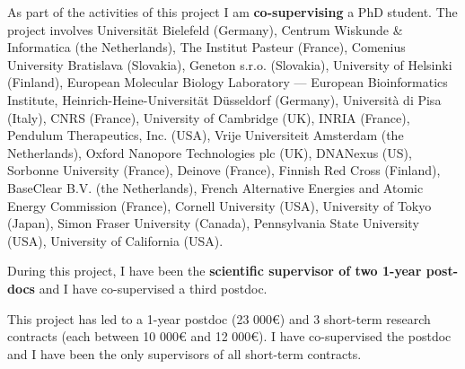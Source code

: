 \documentclass[11pt,a4paper,roman]{moderncv}
\begin{document}
As part of the activities of this project I am \textbf{co-supervising} a PhD student.
The project involves Universität Bielefeld (Germany), Centrum Wiskunde \& Informatica (the Netherlands), The
Institut Pasteur (France), Comenius University Bratislava (Slovakia), Geneton s.r.o.
(Slovakia), University of Helsinki (Finland), European Molecular Biology
Laboratory --- European Bioinformatics Institute,
Heinrich-Heine-Universität Düsseldorf (Germany),
Università di Pisa (Italy),
CNRS (France),
University of Cambridge (UK),
INRIA (France),
Pendulum Therapeutics, Inc. (USA),
Vrije Universiteit Amsterdam (the Netherlands),
Oxford Nanopore Technologies plc (UK),
DNANexus (US),
Sorbonne University (France),
Deinove (France),
Finnish Red Cross (Finland),
BaseClear B.V. (the Netherlands),
French Alternative Energies and Atomic Energy Commission (France),
Cornell University (USA),  University of Tokyo (Japan),
Simon Fraser University (Canada), Pennsylvania State University (USA),
University of California (USA).



During this project, I have been the \textbf{scientific supervisor of two
	1-year post-docs} and I have co-supervised a third postdoc.


This project has led to a 1-year postdoc (23 000€) and 3 short-term research
contracts (each between 10 000€ and 12 000€).
I have co-supervised the postdoc and I have been the only supervisors of all
short-term contracts.
\end{document}

